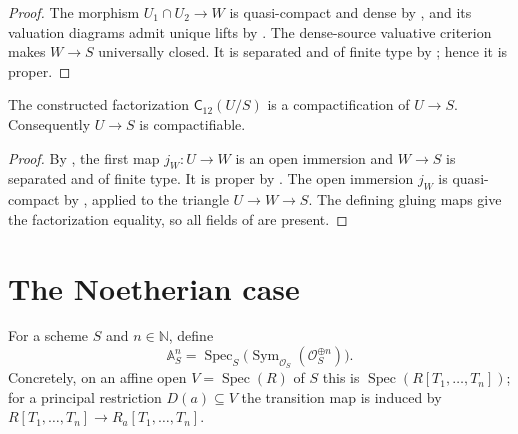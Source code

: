 \begin{proof}
  \leanok
  The morphism $U_1\cap U_2\to W$ is quasi-compact and dense by
  , and its valuation diagrams admit unique
  lifts by .  The dense-source
  valuative criterion makes $W\to S$ universally closed.  It is separated
  and of finite type by
  ; hence it is proper.
\end{proof}

\begin{theorem}
  \label{thm:nagata-two-open}
  \leanok

  The constructed factorization $\mathsf C_{12}(U/S)$ is a compactification
  of $U\to S$.  Consequently $U\to S$ is compactifiable.
\end{theorem}

\begin{proof}
  \leanok
  By , the first map
  $j_W\colon U\to W$ is an open immersion and $W\to S$ is separated and of
  finite type.  It is proper by
  .  The open immersion $j_W$ is
  quasi-compact by
  , applied to the
  triangle $U\to W\to S$.  The defining gluing maps give the factorization
  equality, so all fields of  are present.
\end{proof}


\section{The Noetherian case}

\begin{definition}
  \label{def:nagata-relative-affine-space}
  \leanok

  For a scheme $S$ and $n\in\mathbb N$, define
  \[
    \mathbb A^n_S=\operatorname{Spec}_S
      \bigl(\operatorname{Sym}_{\mathcal O_S}(\mathcal O_S^{\oplus n})\bigr).
  \]
  Concretely, on an affine open $V=\operatorname{Spec}(R)$ of $S$ this is
  $\operatorname{Spec}(R[T_1,\ldots,T_n])$; for a principal restriction
  $D(a)\subseteq V$ the transition map is induced by
  $R[T_1,\ldots,T_n]\to R_a[T_1,\ldots,T_n]$.
\end{definition}

